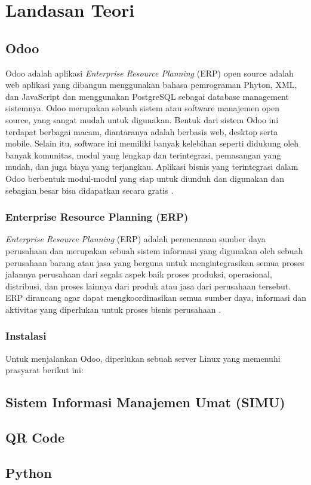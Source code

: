 \chapter{Landasan Teori}
\label{sec:landasanteori}

\section{Odoo}
\label{sec:odoo}

Odoo adalah aplikasi \textit{Enterprise Resource Planning} (ERP) open source adalah web aplikasi yang dibangun menggunakan bahasa pemrograman Phyton, XML, dan JavaScript dan menggunakan PostgreSQL sebagai database management sistemnya.  Odoo merupakan sebuah sistem atau software manajemen open source, yang sangat mudah untuk digunakan. Bentuk dari sistem Odoo ini terdapat berbagai macam, diantaranya adalah berbasis web, desktop serta mobile. Selain itu, software ini memiliki banyak kelebihan seperti didukung oleh banyak komunitas, modul yang lengkap dan terintegrasi, pemasangan yang mudah, dan juga biaya yang terjangkau. Aplikasi bisnis yang terintegrasi dalam Odoo berbentuk modul-modul yang siap untuk diunduh dan digunakan dan sebagian besar bisa didapatkan secara gratis \cite{suminten}.

\subsection{Enterprise Resource Planning (ERP)}
\label{sec:erp}
\textit{Enterprise Resource Planning} (ERP) adalah perencanaan sumber daya perusahaan dan merupakan sebuah sistem informasi yang digunakan oleh sebuah perusahaan barang atau jasa yang berguna untuk mengintegrasikan semua proses jalannya perusahaan dari segala aspek baik proses produksi, operasional, distribusi, dan proses lainnya dari produk atau jasa dari perusahaan tersebut. ERP dirancang agar dapat mengkoordinasikan semua sumber daya, informasi dan aktivitas yang diperlukan untuk proses bisnis perusahaan 	\cite{putra}.

\subsection{Instalasi}
\label{sec:instalasi}
Untuk menjalankan Odoo, diperlukan sebuah server Linux yang memenuhi prasyarat berikut ini:

\section{Sistem Informasi Manajemen Umat (SIMU)}
\label{sec:simu}

\section{QR Code}
\label{sec:qr}

\section{Python}
\label{sec:python}
